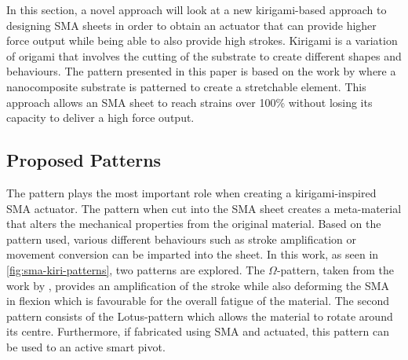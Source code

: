 In this section, a novel approach will look at a new kirigami-based approach to designing SMA sheets in order to obtain an actuator that can provide higher force output while being able to also provide high strokes. Kirigami is a variation of origami that involves the cutting of the substrate to create different shapes and behaviours. The pattern presented in this paper is based on the work by \cite{shyuKirigamiApproachEngineering2015} where a nanocomposite substrate is patterned to create a stretchable element. This approach allows an SMA sheet to reach strains over 100\% without losing its capacity to deliver a high force output.

\subsection{Proposed Patterns}
The pattern plays the most important role when creating a kirigami-inspired SMA actuator. The pattern when cut into the SMA sheet creates a meta-material that alters the mechanical properties from the original material. Based on the pattern used, various different behaviours such as stroke amplification or movement conversion can be imparted into the sheet. In this work, as seen in \cref{fig:sma-kiri-patterns}, two patterns are explored. The $\Omega$-pattern, taken from the work by \cite{shyuKirigamiApproachEngineering2015}, provides an amplification of the stroke while also deforming the SMA in flexion which is favourable for the overall fatigue of the material. The second pattern consists of the Lotus-pattern which allows the material to rotate around its centre. Furthermore, if fabricated using SMA and actuated, this pattern can be used to an active smart pivot.

